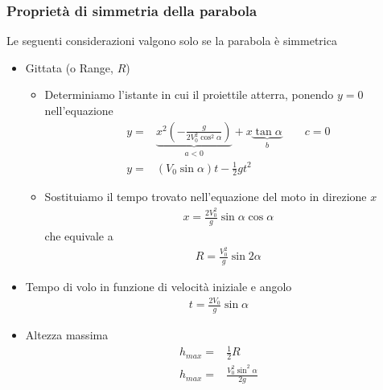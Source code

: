 \documentclass[../main.tex]{subfiles}
\begin{document}
\subsubsection{Proprietà di simmetria della parabola}
Le seguenti considerazioni valgono solo se la parabola è simmetrica
\begin{itemize}
    \item Gittata (o Range, $R$)
    \begin{itemize}
        \item Determiniamo l'istante in cui il proiettile atterra, ponendo $y=0$ nell'equazione \begin{align*}
            y =& \underbrace{x^2(-\frac{g}{2V_0^2\cos^2\alpha}) }_{a<0} + x \underbrace{\tan\alpha }_{b} \phantom{--} c = 0 \\
            y =& (V_0 \sin\alpha)t-\frac{1}{2}gt^2
        \end{align*}
        \item Sostituiamo il tempo trovato nell'equazione del moto in direzione $x$ \begin{align*}
            x = \frac{2V_0^2}{g}\sin\alpha\cos\alpha
        \end{align*}
        che equivale a \begin{align*}
            R = \frac{V_0^2}{g}\sin 2 \alpha
        \end{align*}
    \end{itemize}
    \item Tempo di volo in funzione di velocità iniziale e angolo \begin{align*}
        t = \frac{2V_0}{g}\sin\alpha
    \end{align*}
    \item Altezza massima \begin{align*}
        h_{max} =& \frac{1}{2}R \\
        h_{max} =& \frac{V_0^2\sin^2 \alpha}{2g}
    \end{align*}
\end{itemize}
\end{document}
